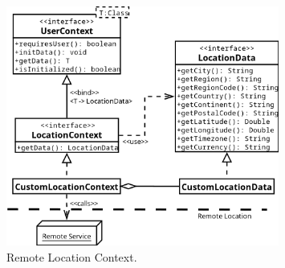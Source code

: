 \begin{figure}[htbp]
  \centering
  \includegraphics[width=0.8\textwidth]{img/sections/5-design/location-diagram.png}
  \caption{Remote Location Context.}
  \label{fig:design-external-integration}
\end{figure}

\newpage